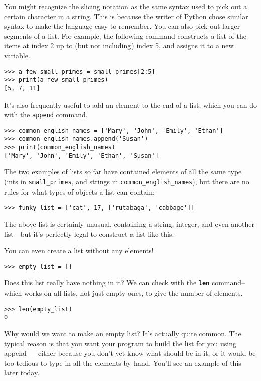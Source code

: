 You might recognize the slicing notation as the same syntax used to pick out a certain character in a string. This is because the writer of Python chose similar syntax to make the language easy to remember.  You can also pick out larger segments of a list. For example, the following command constructs a list of the items at index 2 up to (but not including) index 5, and assigns it to a new variable.

\begin{lstlisting}[numbers=none]
>>> a_few_small_primes = small_primes[2:5]
>>> print(a_few_small_primes)
[5, 7, 11]
\end{lstlisting}

It's also frequently useful to add an element to the end of a list, which you can do with the \texttt{append} command.

\begin{lstlisting}[numbers=none]
>>> common_english_names = ['Mary', 'John', 'Emily', 'Ethan']
>>> common_english_names.append('Susan')
>>> print(common_english_names)
['Mary', 'John', 'Emily', 'Ethan', 'Susan']
\end{lstlisting}

The two examples of lists so far have contained elements of all the same type (ints in \texttt{small\_primes}, and strings in \texttt{common\_english\_names}), but there are no rules for what types of objects a list can contain:

\begin{lstlisting}[numbers=none]
>>> funky_list = ['cat', 17, ['rutabaga', 'cabbage']]
\end{lstlisting}

The above list is certainly unusual, containing a string, integer, and even another list---but it's perfectly legal to construct a list like this. 

You can even create a list without any elements!

\begin{lstlisting}[numbers=none]
>>> empty_list = []
\end{lstlisting}

Does this list really have nothing in it? We can check with the \texttt{\textbf{len}} command--which works on all lists, not just empty ones, to give the number of elements.

\begin{lstlisting}[numbers=none]
>>> len(empty_list)
0
\end{lstlisting}

Why would we want to make an empty list? It's actually quite common. The typical reason is that you want your program to build the list for you using append --- either because you don't yet know what should be in it, or it would be too tedious to type in all the elements by hand. You'll see an example of this later today.


